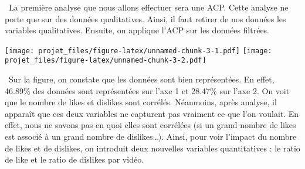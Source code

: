 \documentclass[
]{article}
\newenvironment{Shaded}{\begin{snugshade}}{\end{snugshade}}
\newcommand{\CommentTok}[1]{\textcolor[rgb]{0.56,0.35,0.01}{\textit{#1}}}
\newcommand{\DataTypeTok}[1]{\textcolor[rgb]{0.13,0.29,0.53}{#1}}
\newcommand{\DecValTok}[1]{\textcolor[rgb]{0.00,0.00,0.81}{#1}}
\newcommand{\KeywordTok}[1]{\textcolor[rgb]{0.13,0.29,0.53}{\textbf{#1}}}
\newcommand{\NormalTok}[1]{#1}
\newcommand{\OperatorTok}[1]{\textcolor[rgb]{0.81,0.36,0.00}{\textbf{#1}}}
\newcommand{\OtherTok}[1]{\textcolor[rgb]{0.56,0.35,0.01}{#1}}
\newcommand{\StringTok}[1]{\textcolor[rgb]{0.31,0.60,0.02}{#1}}
\begin{document}
 La première analyse que nous allons effectuer sera une ACP. Cette
analyse ne porte que sur des données qualitatives. Ainsi, il faut
retirer de nos données les variables qualitatives. Ensuite, on applique
l'ACP sur les données filtrées.

\begin{Shaded}
\end{Shaded}

\texttt{[image: projet\_files/figure-latex/unnamed-chunk-3-1.pdf]}
\texttt{[image: projet\_files/figure-latex/unnamed-chunk-3-2.pdf]}

 Sur la figure, on constate que les données sont bien représentées. En
effet, 46.89\% des données sont représentées sur l'axe 1 et 28.47\% sur
l'axe 2. On voit que le nombre de likes et dislikes sont corrélés.
Néanmoins, après analyse, il apparaît que ces deux variables ne
capturent pas vraiment ce que l'on voulait. En effet, nous ne savons pas
en quoi elles sont corrélées (si un grand nombre de likes est associé à
un grand nombre de dislikes\ldots). Ainsi, pour voir l'impact du nombre
de likes et de dislikes, on introduit deux nouvelles variables
quantitatives : le ratio de like et le ratio de dislikes par vidéo.
\end{document}
